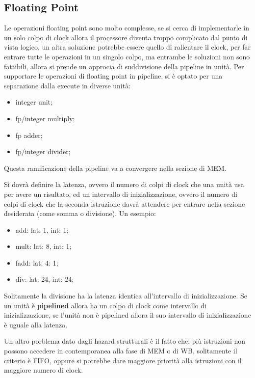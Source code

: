 \documentclass[12pt]{article}
\begin{document}
\subsection{Floating Point}
Le operazioni floating point sono molto complesse, se si cerca di implementarle in un solo colpo di clock allora il processore diventa troppo complicato dal punto di vista logico, un altra soluzione potrebbe essere quello di rallentare il clock, per far entrare tutte le operazioni in un singolo colpo, ma entrambe le soluzioni non sono fattibili, allora si prende un approcia di suddivisione della pipeline in unit\`a. Per supportare le operazioni di floating point in pipeline, si \`e optato per una separazione dalla execute in diverse unit\`a:
\begin{itemize}
    \item integer unit;
    \item fp/integer multiply;
    \item fp adder;
    \item fp/integer divider;
\end{itemize}
Questa ramificazione della pipeline va a convergere nella sezione di MEM.

Si dovr\`a definire la latenza, ovvero il numero di colpi di clock che una unit\`a usa per avere un risultato, ed un intervallo di inizializzazione, ovvero il numero di colpi di clock che la seconda istruzione davr\`a attendere per entrare nella sezione desiderata (come somma o divisione). Un esempio:
\begin{itemize}
    \item add: lat: 1, int: 1;
    \item mult: lat: 8, int: 1;
    \item fadd: lat: 4: 1;
    \item div: lat: 24, int: 24;
\end{itemize}

Solitamente la divisione ha la latenza identica all'intervallo di inizializzazione. Se un unit\`a \`e \textbf{pipelined} allora ha un colpo di clock come intervallo di inizializzazione, se l'unit\`a non \`e pipelined allora il suo intervallo di inizializzazione \`e uguale alla latenza.


Un altro porblema dato dagli hazard strutturali \`e il fatto che: pi\`u istruzioni non possono accedere in contemporanea alla fase di MEM o di WB, solitamente il criterio \`e FIFO, oppure si potrebbe dare maggiore priorit\`a alla istruzioni con il maggiore numero di clock.
\end{document}
